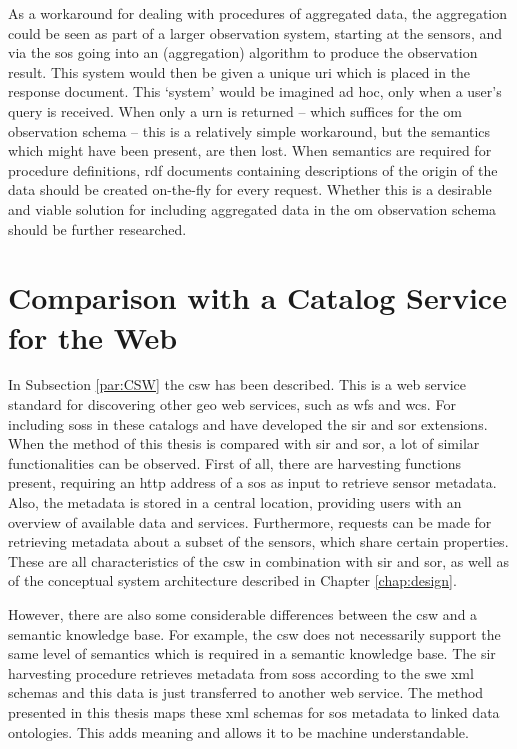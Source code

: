 As a workaround for dealing with procedures of aggregated data, the aggregation could be seen as part of a larger observation system, starting at the sensors, and via the \ac{sos} going into an (aggregation) algorithm to produce the observation result. This system would then be given a unique \ac{uri} which is placed in the response document. This `system' would be imagined ad hoc, only when a user's query is received. When only a \ac{urn} is returned -- which suffices for the \ac{om} observation schema -- this is a relatively simple workaround, but the semantics which might have been present, are then lost. When semantics are required for procedure definitions, \ac{rdf} documents containing descriptions of the origin of the data should be created on-the-fly for every request. Whether this is a desirable and viable solution for including aggregated data in the \ac{om} observation schema should be further researched.        

\section{Comparison with a Catalog Service for the Web}
\label{compareCSW}
In Subsection \ref{par:CSW} the \acl{csw} has been described. This is a web service standard for discovering other geo web services, such as \ac{wfs} and \ac{wcs}. For including \aclp{sos} in these catalogs \cite{SW:OGC4} and \cite{SW:OGC3} have developed the \ac{sir} and \ac{sor} extensions. When the method of this thesis is compared with \ac{sir} and \ac{sor}, a lot of similar functionalities can be observed. First of all, there are harvesting functions present, requiring an \ac{http} address of a \ac{sos} as input to retrieve sensor metadata. Also, the metadata is stored in a central location, providing users with an overview of available data and services. Furthermore, requests can be made for retrieving metadata about a subset of the sensors, which share certain properties. These are all characteristics of the \ac{csw} in combination with \ac{sir} and \ac{sor}, as well as of the conceptual system architecture described in Chapter \ref{chap:design}.  

However, there are also some considerable differences between the \ac{csw} and a semantic knowledge base. For example, the \ac{csw} does not necessarily support the same level of semantics which is required in a semantic knowledge base. The \ac{sir} harvesting procedure retrieves metadata from \aclp{sos} according to the \ac{swe} \ac{xml} schemas and this data is just transferred to another web service. The method presented in this thesis maps these \ac{xml} schemas for \ac{sos} metadata to linked data ontologies. This adds meaning and allows it to be machine understandable.

